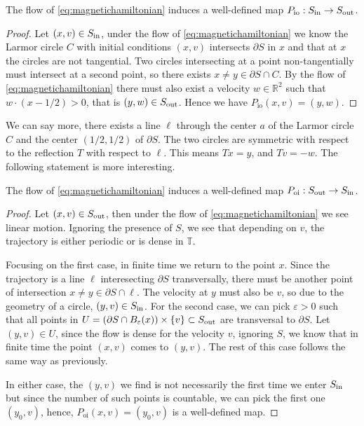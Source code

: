 \begin{lemma}
The flow of \eqref{eq:magnetichamiltonian} induces a well-defined map $P_\text{io}:S_\text{in}\to S_\text{out}$.
\end{lemma}
\begin{proof}
Let $(x,v)\in S_\text{in}$, under the flow of \eqref{eq:magnetichamiltonian} we know the Larmor circle $C$ with initial conditions $(x,v)$ intersects $\partial S$ in $x$ and that at $x$ the circles are not tangential. Two circles intersecting at a point non-tangentially must intersect at a second point, so there exists $x\neq y\in\partial S\cap C$. By the flow of \eqref{eq:magnetichamiltonian} there must also exist a velocity $w\in\mathbb R^2$ such that $w\cdot(x-1/2)>0$, that is $(y,w)\in S_\text{out}$. Hence we have $P_\text{io}(x,v) = (y,w)$. 
\end{proof}

We can say more, there exists a line $\ell$ through the center $a$ of the Larmor circle $C$ and the center $(1/2,1/2)$ of $\partial S$. The two circles are symmetric with respect to the reflection $T$ with respect to $\ell$. This means $Tx=y$, and $Tv = -w$. The following statement is more interesting.

\begin{lemma}\label{lem:SoutToSin}
The flow of \eqref{eq:magnetichamiltonian} induces a well-defined map $P_\text{oi}:S_\text{out}\to S_\text{in}$.
\end{lemma}
\begin{proof}
Let $(x,v)\in S_\text{out}$, then under the flow of \eqref{eq:magnetichamiltonian} we see linear motion. Ignoring the presence of $S$, we see that depending on $v$, the trajectory is either periodic or is dense in $\mathbb T$.

Focusing on the first case, in finite time we return to the point $x$. Since the trajectory is a line $\ell$ interesecting $\partial S$ transversally, there must be another point of intersection $x\neq y\in\partial S\cap\ell$. The velocity at $y$ must also be $v$, so due to the geometry of a circle, $(y,v)\in S_\text{in}$. For the second case, we can pick $\varepsilon>0$ such that all points in $U=(\partial S\cap B_\varepsilon(x))\times\{v\}\subset S_\text{out}$ are transversal to $\partial S$. Let $(y,v)\in U$, since the flow is dense for the velocity $v$, ignoring $S$, we know that in finite time the point $(x,v)$ comes to $(y,v)$. The rest of this case follows the same way as previously. 

In either case, the $(y,v)$ we find is not necessarily the first time we enter $S_\text{in}$ but since the number of such points is countable, we can pick the first one $(y_0,v)$, hence, $P_\text{oi}(x,v) = (y_0,v)$ is a well-defined map.
\end{proof}

